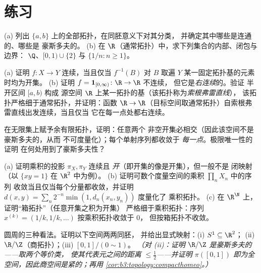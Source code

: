 \section{练习}

\begin{exercise}[$\star$]\label{exo:b3:topology:1}
(a) 列出 $\{a, b\}$ 上的全部拓扑，在同胚意义下对其分类，
并确定其中哪些是连通的、哪些是
豪斯多夫的。
(b) 在 $\R$（通常拓扑）中，求下列集合的内部、闭包与边界：
$\Q$、$[0,1) \cup \{2\}$ 与 $\{1/n : n \geq
1\}$。
\end{exercise}

\begin{exercise}[$\star$]\label{exo:b3:topology:2}
(a) 证明 $f\colon X \to Y$ 连续，当且仅当
$f^{-1}(B)$ 对 $B$ 取遍 $Y$ 某一固定拓扑基的元素时均为开集。
(b) 证明 $f = \mathbf 1_{[0,\infty)} \colon \R \to \R$ 不连续，
但它是\emph{右连续}的。验证
半开区间 $[a, b)$ 构成
源空间 $\R$ 上某一拓扑的基（该拓扑称为\emph{索根弗雷直线}），
该拓扑严格细于通常拓扑，并证明：函数 $\R \to
\R$（目标空间取通常拓扑）自索根弗雷直线出发连续，当且仅当
它在每一点处都右连续。
\end{exercise}

\begin{exercise}[$\star$]\label{exo:b3:topology:3}
在无限集上赋予余有限拓扑，证明：任意两个
非空开集必相交（因此该空间不是豪斯多夫的，从而
不可度量化）；每个单射序列都收敛于
\emph{每一点}。极限唯一性的证明
在何处用到了豪斯多夫性？
\end{exercise}

\begin{exercise}[$\star\star$]\label{exo:b3:topology:4}
(a) 证明乘积的投影 $\pi_X, \pi_Y$ 连续且
\emph{开}（即开集的像是开集），但一般不是
闭映射（以 $\{xy = 1\}$ 在 $\R^2$ 中为例）。
(b) 证明可数个度量空间的乘积 $\prod_n X_n$ 中的序列
收敛当且仅当每个分量都收敛，并证明
$d(x, y) = \sum_n 2^{-n}\min(1, d_n(x_n, y_n))$ 度量化了
乘积拓扑。
(c) 在 $\R^\N$ 上，证明“箱拓扑”（任意开集之积为开集）
严格细于乘积拓扑：序列
$x^{(k)} = (1/k, 1/k, \dots)$ 按乘积拓扑收敛于 $0$，
但按箱拓扑不收敛。
\end{exercise}

\begin{exercise}[$\star\star$]\label{exo:b3:topology:5}
圆周的三种看法。证明以下空间两两同胚，
并给出显式映射：(i) $S^1 \subseteq \R^2$；
(ii) $\R/\Z$（商拓扑）；(iii) $[0,1]/(0 \sim 1)$。
\emph{（对 (ii)：证明 $\R/\Z$ 是豪斯多夫的——取两个等价类，
使其代表元之间的距离 $\leq \frac12$——并证明
$\pi([0,1])$ 即为全空间，因此商空间是紧的；再用
\cref{cor:b3:topology:compacthomeo}。）}
\end{exercise}

